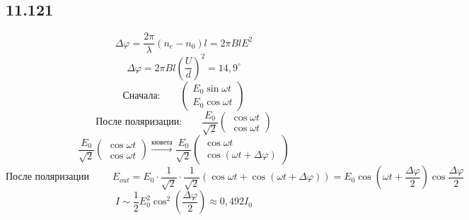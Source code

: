 \subsection*{11.121}
$$\Delta \varphi = \frac{2 \pi}{\lambda} (n_e - n_0) l = 2 \pi Bl E^2$$
$$\Delta \varphi =  2 \pi Bl (\frac{U}{d})^2 = 14,9^{\circ}$$
$$\text{Сначала:} \qquad \begin{pmatrix} E_0 \sin \omega t \\ E_0 \cos \omega t \end{pmatrix}$$
$$\text{После поляризации:} \qquad \frac{E_0}{\sqrt{2}} \begin{pmatrix}\cos \omega t \\ \cos \omega t \end{pmatrix}$$
$$ \frac{E_0}{\sqrt{2}} \begin{pmatrix}\cos \omega t \\ \cos \omega t \end{pmatrix} \overset{кювета}{\rightarrow}  \frac{E_0}{\sqrt{2}} \begin{pmatrix}\cos \omega t \\ \cos (\omega t + \Delta \varphi) \end{pmatrix}$$
$$\text{После поляризации } \qquad E_{out} = E_0 \cdot \frac{1}{\sqrt{2}} \cdot \frac{1}{\sqrt{2}} (\cos \omega t + \cos (\omega t + \Delta \varphi)) = E_0 \cos (\omega t + \frac{\Delta \varphi}{2})  \cos  \frac{\Delta \varphi}{2}$$
$$I \sim \frac{1}{2} E_0^2 \cos^2 (\frac{\Delta \varphi}{2}) \approx 0,492 I_0$$
